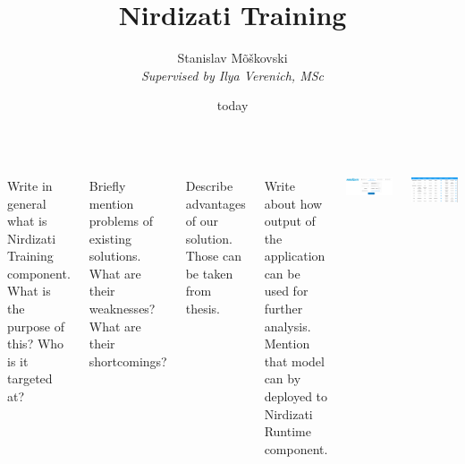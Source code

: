 \documentclass[24pt, a0paper, landscape]{tikzposter}
\title{Nirdizati Training}
\author{Stanislav Mõškovski\\{\small \textit{Supervised by Ilya Verenich, MSc}}}
\date{today}
\institute{Institute of Computer Science, University of Tartu}
\begin{document}
    \maketitle

    \begin{columns}
        {
        Write in general what is Nirdizati Training component.
        What is the purpose of this?
        Who is it targeted at?
        }

        {
        Briefly mention problems of existing solutions.
        What are their weaknesses?
        What are their shortcomings?
        }

        {
        Describe advantages of our solution.
        Those can be taken from thesis.
        }

        {
        Write about how output of the application can be used for further
        analysis.
        Mention that model can by deployed to Nirdizati Runtime component.
        }

        {
        \begin{tikzfigure}
            \includegraphics{figures/training.png}
        \end{tikzfigure}

        \begin{tikzfigure}
            \includegraphics{figures/validation.png}
        \end{tikzfigure}

}
\end{columns}
\end{document}
